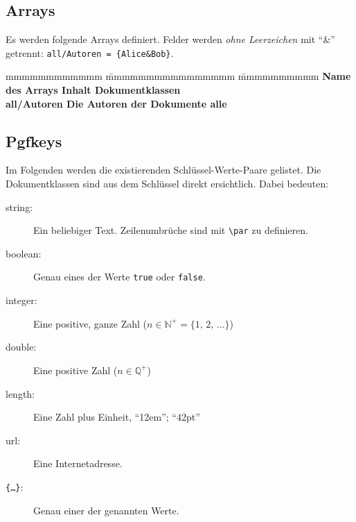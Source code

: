 		\subsection{Arrays}
			Es werden folgende Arrays definiert. Felder werden \emph{ohne Leerzeichen} mit "`\&"' getrennt: \verb|all/Autoren = {Alice&Bob}|.
			\begin{tabbing}
				mmmmmmmmmmmm 		\= mmmmmmmmmmmmmmmm				\=	mmmmmmmmmm	\kill
				\bf Name des Arrays	\> \bf Inhalt 					\> \bf Dokumentklassen\\
				 all/Autoren		\> Die Autoren der Dokumente	\> alle
			\end{tabbing}
		\subsection{Pgfkeys}
			Im Folgenden werden die existierenden Schlüssel-Werte-Paare gelistet. Die Dokumentklassen sind aus dem Schlüssel direkt ersichtlich. Dabei bedeuten:
			\begin{description}
				\item[string:] 
						Ein beliebiger Text. Zeilenumbrüche sind mit \verb|\par| zu definieren.
				\item[boolean:] 
						Genau eines der Werte \texttt{true} oder \texttt{false}.
				\item[integer:]
						Eine positive, ganze Zahl ($n \in \mathbb N^+ = \{1, \, 2, \, \ldots\}$)
				\item[double:]
						Eine positive Zahl ($n \in \mathbb Q^+$)
				\item[length:]
						Eine Zahl plus Einheit, \zb "`12em"'; "`42pt"'
				\item[url:]
						Eine Internetadresse.
				\item[{\tt \{\ldots\}}:] 
						Genau einer der genannten Werte.
			\end{description}
			\newpage

